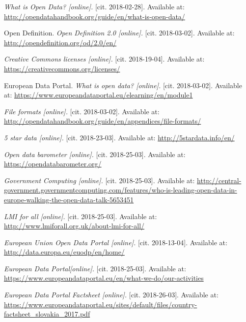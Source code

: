 \documentclass[thesis=B,english]{sprlajur-slovakopendata}[2018/05/12]
\begin{document}
{	
	\begin{thebibliography}{9}
		\textit{What is Open Data? [online].}
		[cit. 2018-02-28]. Available at: \url{http://opendatahandbook.org/guide/en/what-is-open-data/} 
		
		Open Definition.
		\textit{Open Definition 2.0 [online].}
		[cit. 2018-03-02]. Available at: \url{http://opendefinition.org/od/2.0/en/} 
		
		\textit{Creative Commons licenses [online].}
		[cit. 2018-19-04]. Available at: \url{https://creativecommons.org/licenses/}
		
		European Data Portal.
		\textit{What is open data? [online].}
		[cit. 2018-03-02]. Available at: \url{https://www.europeandataportal.eu/elearning/en/module1} 
		
		\textit{File formats [online].}
		[cit. 2018-03-02]. Available at: \url{http://opendatahandbook.org/guide/en/appendices/file-formats/} 
		
		\textit{5 star data [online].}
		[cit. 2018-23-03]. Available at: \url{http://5stardata.info/en/} 
		
		\textit{Open data barometer [online].}
		[cit. 2018-25-03]. Available at: \url{https://opendatabarometer.org/}
		
		\textit{Government Computing [online].}
		[cit. 2018-25-03]. Available at: \url{http://central-government.governmentcomputing.com/features/who-is-leading-open-data-in-europe-walking-the-open-data-talk-5653451}
		
		\textit{LMI for all [online].}
		[cit. 2018-25-03]. Available at: \url{http://www.lmiforall.org.uk/about-lmi-for-all/}
		
		\textit{European Union Open Data Portal [online].}
		[cit. 2018-13-04]. Available at: \url{http://data.europa.eu/euodp/en/home/}
		
		\textit{European Data Portal[online].}
		[cit. 2018-25-03]. Available at: \url{https://www.europeandataportal.eu/en/what-we-do/our-activities}
		
		\textit{European Data Portal Factsheet [online].}
		[cit. 2018-26-03]. Available at: \url{https://www.europeandataportal.eu/sites/default/files/country-factsheet_slovakia_2017.pdf}
		

\end{thebibliography}}
\end{document}

